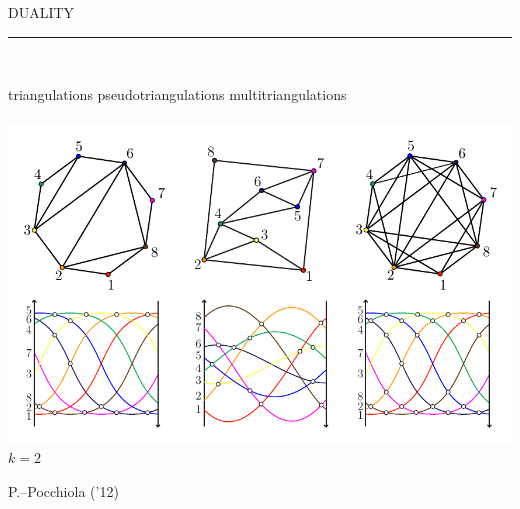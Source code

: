 \documentclass[12pt,titlepage,landscape,a4paper]{article}
\newcommand{\textemoyen}{\fontsize{23}{27}\selectfont}
\newenvironment{slide}[1]
{
\newpage
\begin{center}
{\blue \textemoyen \uppercase{#1}}\\
\end{center}
\vspace{-1cm}
\rule{\textwidth}{0.5 pt}\\
\vspace{-.8cm}
}
{\vspace*{-3cm}}
\newcommand{\violet}{\color{violet}} %
\newcommand{\blue}{\color{blue}} %
\newcommand{\papier}[1]{{\violet\fontsize{15}{20}\selectfont #1}} %
\begin{document}

\begin{slide}{Duality}
\hspace{1.6cm} triangulations \hspace{3.4cm} pseudotriangulations \hspace{2.5cm} multitriangulations\\
\vspace{-.5cm}\\
\vspace*{-2cm}
\hspace*{-.6cm}\includegraphics[scale=1.9]{geometricStructures6}
\vspace{-8.5cm} \\ \hspace*{25.7cm} ${k=2}$

\vspace{7.6cm}
\papier{P.--Pocchiola ('12)}

\vspace*{-3cm}
\end{slide}

%
%
\end{document}
